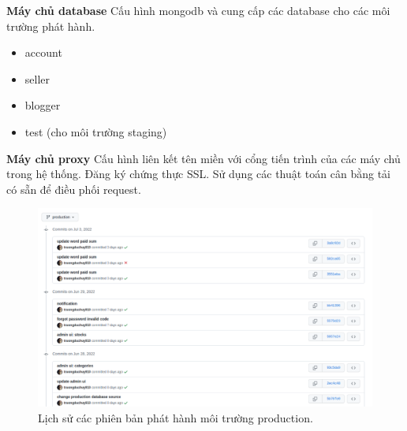 \textbf{Máy chủ database}
Cấu hình mongodb và cung cấp các database cho các môi trường phát hành.
\begin{itemize}
	\item account
	\item seller
	\item blogger
	\item test (cho môi trường staging)
\end{itemize}
\textbf{Máy chủ proxy}
Cấu hình liên kết tên miền với cổng tiến trình của các máy chủ trong hệ thống. Đăng ký chứng thực SSL. Sử dụng các thuật toán cân bằng tải có sẵn để điều phối request.

\begin{figure}[h!]
	\begin{center}	
		\includegraphics[width=\textwidth]{./results/commit}
		\caption{Lịch sử các phiên bản phát hành môi trường production.}
	\end{center}
	
\end{figure}

